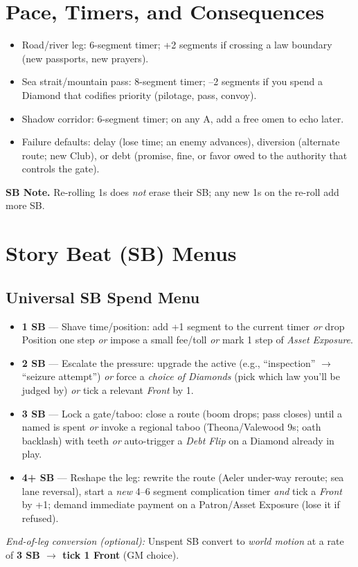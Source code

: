 \documentclass[11pt,letterpaper,twoside]{book}
\begin{document}
\section{Pace, Timers, and Consequences}

\begin{itemize}
\item Road/river leg: 6-segment timer; +2 segments if crossing a law boundary (new passports, new prayers).
\item Sea strait/mountain pass: 8-segment timer; --2 segments if you spend a Diamond that codifies priority (pilotage, pass, convoy).
\item Shadow corridor: 6-segment timer; on any A, add a free omen to echo later.
\item Failure defaults: delay (lose time; an enemy advances), diversion (alternate route; new Club), or debt (promise, fine, or favor owed to the authority that controls the gate).
\end{itemize}

\noindent\textbf{SB Note.} Re-rolling 1s does \emph{not} erase their SB; any new 1s on the re-roll add more SB.

\section{Story Beat (SB) Menus}

\subsection{Universal SB Spend Menu}
\begin{itemize}
  \item \textbf{1 SB} --- Shave time/position: add +1 segment to the current timer \emph{or} drop Position one step \emph{or} impose a small fee/toll \emph{or} mark 1 step of \emph{Asset Exposure}.
  \item \textbf{2 SB} --- Escalate the pressure: upgrade the active \clubsuit{} (e.g., ``inspection'' $\rightarrow$ ``seizure attempt'') \emph{or} force a \emph{choice of Diamonds} (pick which law you'll be judged by) \emph{or} tick a relevant \emph{Front} by 1.
  \item \textbf{3 SB} --- Lock a gate/taboo: close a route (boom drops; pass closes) until a named \diamondsuit{} is spent \emph{or} invoke a regional taboo (Theona/Valewood 9s; oath backlash) with teeth \emph{or} auto-trigger a \emph{Debt Flip} on a Diamond already in play.
  \item \textbf{4+ SB} --- Reshape the leg: rewrite the route (Aeler under-way reroute; sea lane reversal), start a \emph{new} 4--6 segment complication timer \emph{and} tick a \emph{Front} by +1; demand immediate payment on a Patron/Asset Exposure (lose it if refused).
\end{itemize}
\textit{End-of-leg conversion (optional):} Unspent SB convert to \emph{world motion} at a rate of \textbf{3 SB $\rightarrow$ tick 1 Front} (GM choice).
\end{document}
